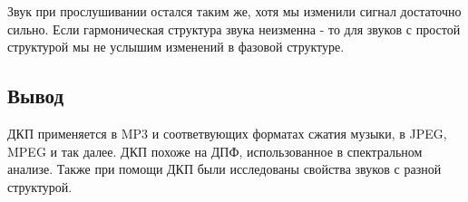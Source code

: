 Звук при прослушивании остался таким же, хотя мы изменили сигнал достаточно сильно. Если гармоническая структура звука неизменна - то для звуков с простой структурой мы не услышим изменений в фазовой структуре.

\subsection{Вывод}

ДКП применяется в MP3 и соответвующих форматах сжатия музыки, в JPEG, MPEG и так далее. ДКП похоже на ДПФ, использованное в спектральном анализе. Также при помощи ДКП были исследованы свойства звуков с разной структурой.